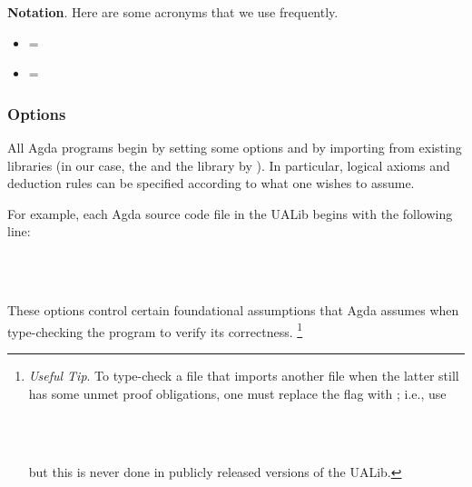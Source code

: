 \textbf{Notation}. Here are some acronyms that we use frequently.

\begin{itemize}
\tightlist
\item \mhe = \MHE
\item \mltt = \MLTT
\end{itemize}

\subsubsection{Options}\label{options}
All Agda programs begin by setting some options and by importing from existing libraries (in our case, the \agdastdlib and the \TypeTopology library by \mhe). In particular,
logical axioms and deduction rules can be specified according to what one wishes to assume.

For example, each Agda source code file in the UALib begins with the
following line:

\begin{code}%
\>[0]\<%
\\
\>[0]\AgdaSymbol{\{-\#}\AgdaSpace{}%
\AgdaSpace{}%
\AgdaSpace{}%
\AgdaSpace{}%
\AgdaSpace{}%
\AgdaSymbol{\#-\}}\<%
\\
\>[0]\<%
\end{code}

These options control certain foundational assumptions that Agda assumes
when type-checking the program to verify its correctness.%
\footnote{\emph{Useful Tip}. To type-check a file that imports another file when the latter still has some unmet proof obligations, one must replace the  flag with ; i.e., use
\begin{code}%
\>[0]\<%
\\
\>[0]\AgdaSymbol{\{-\#}\AgdaSpace{}%
\AgdaSpace{}%
\AgdaSpace{}%
\AgdaSpace{}%
\AgdaSpace{}%
\AgdaSymbol{\#-\}}\<%
\\
\>[0]\<%
\end{code}
but this is never done in publicly released versions of the UALib.}


